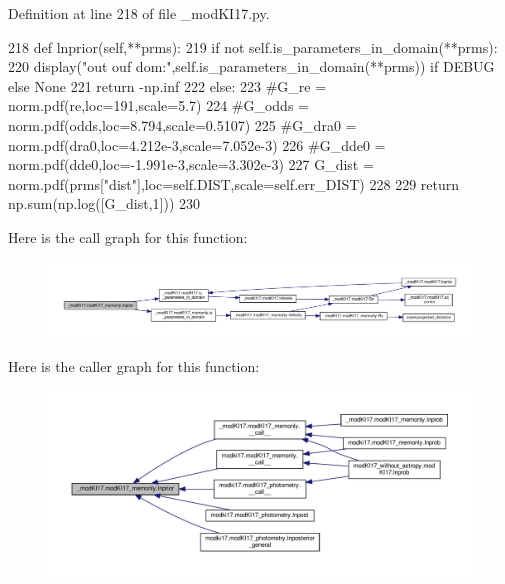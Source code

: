 Definition at line 218 of file \+\_\+mod\+K\+I17.\+py.


\begin{DoxyCode}
218     \textcolor{keyword}{def }lnprior(self,**prms):
219         \textcolor{keywordflow}{if} \textcolor{keywordflow}{not} self.is\_parameters\_in\_domain(**prms):
220             display(\textcolor{stringliteral}{"out ouf dom:"},self.is\_parameters\_in\_domain(**prms)) \textcolor{keywordflow}{if} DEBUG \textcolor{keywordflow}{else} \textcolor{keywordtype}{None}
221             \textcolor{keywordflow}{return} -np.inf
222         \textcolor{keywordflow}{else}:
223             \textcolor{comment}{#G\_re = norm.pdf(re,loc=191,scale=5.7)}
224             \textcolor{comment}{#G\_odds = norm.pdf(odds,loc=8.794,scale=0.5107)}
225             \textcolor{comment}{#G\_dra0 = norm.pdf(dra0,loc=4.212e-3,scale=7.052e-3)}
226             \textcolor{comment}{#G\_dde0 = norm.pdf(dde0,loc=-1.991e-3,scale=3.302e-3)}
227             G\_dist = norm.pdf(prms[\textcolor{stringliteral}{"dist"}],loc=self.DIST,scale=self.err\_DIST)
228         
229             \textcolor{keywordflow}{return} np.sum(np.log([G\_dist,1]))
230 
\end{DoxyCode}
Here is the call graph for this function\+:\nopagebreak
\begin{figure}[H]
\begin{center}
\leavevmode
\includegraphics[width=350pt]{d9/d8f/class__modKI17_1_1modKI17__memonly_a81432d4c6b99b0325dec864f96d55129_cgraph}
\end{center}
\end{figure}
Here is the caller graph for this function\+:\nopagebreak
\begin{figure}[H]
\begin{center}
\leavevmode
\includegraphics[width=350pt]{d9/d8f/class__modKI17_1_1modKI17__memonly_a81432d4c6b99b0325dec864f96d55129_icgraph}
\end{center}
\end{figure}
\mbox{\label{class__modKI17_1_1modKI17__memonly_a76cb36f7f23a5dd7f537f9769bd75a4e}} 
